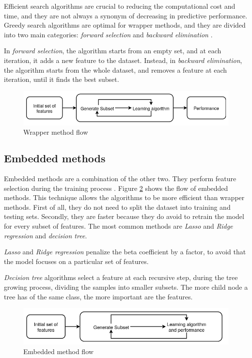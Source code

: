 Efficient search algorithms are crucial to reducing the computational cost and time, and they are not always a synonym of decreasing in predictive performance. Greedy search algorithms are optimal for wrapper methods, and they are divided into two main categories: \textit{forward selection} and \textit{backward elimination} \cite{reunanen2003overfitting}.

In \textit{forward selection}, the algorithm starts from an empty set, and at each iteration, it adds a new feature to the dataset. Instead, in \textit{backward elimination}, the algorithm starts from the whole dataset, and removes a feature at each iteration, until it finds the best subset.

\begin{figure}[!h]
	\centering
	\includegraphics[width=1.0\columnwidth]{wrapper2}
	\caption{Wrapper method flow}
	\label{fig:wrapper}
\end{figure}



\subsection{Embedded methods}

Embedded methods are a combination of the other two. They perform feature selection during the training process \cite{guyon2003introduction}. Figure \ref{fig:embedded} shows the flow of embedded methods. This technique allows the algorithms to be more efficient than wrapper methods. First of all, they do not need to split the dataset into training and testing sets. Secondly, they are faster because they do avoid to retrain the model for every subset of features.
The most common methods are \textit{Lasso} and \textit{Ridge regression} and \textit{decision tree}.

\textit{Lasso} and \textit{Ridge regression} penalize the beta coefficient by a factor, to avoid that the model focuses on a particular set of features.

\textit{Decision tree }algorithms select a feature at each recursive step, during the tree growing process, dividing the samples into smaller subsets. The more child node a tree has of the same class, the more important are the features.

\begin{figure}[!h]
	\centering
	\includegraphics[width=1.0\columnwidth]{embedded2}
	\caption{Embedded method flow}
	\label{fig:embedded}
\end{figure}